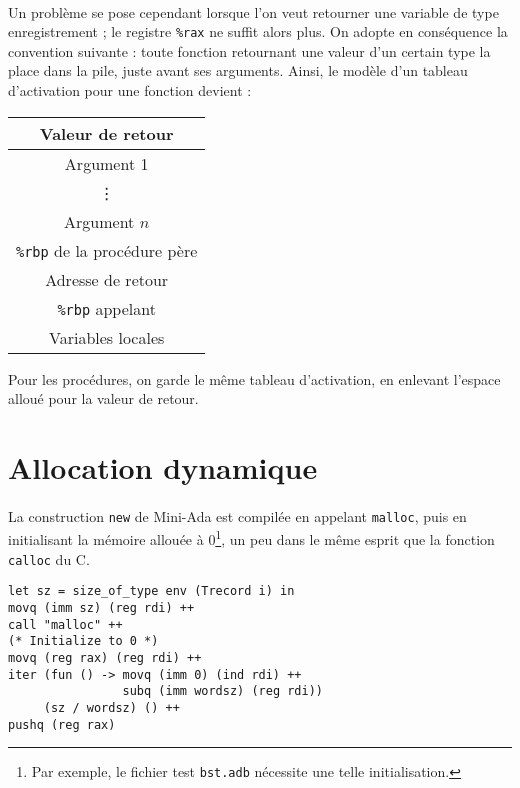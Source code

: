 \documentclass[a4paper,12pt]{article}
\begin{document}
\paragraph*{}
Un problème se pose cependant lorsque l'on veut retourner une variable de type enregistrement ; le registre
\texttt{\%rax} ne suffit alors plus. On adopte en conséquence la convention suivante : toute fonction retournant une valeur d'un certain type la place dans la pile,
juste avant ses arguments. Ainsi, le modèle d'un tableau d'activation pour une fonction devient :

\begin{center}
\begin{tabular}{|c|}
  \hline
  Valeur de retour\\
  \hline
  Argument 1\\
  \hline
  \vdots\\
  \hline
  Argument $n$\\
  \hline
  \texttt{\%rbp} de la procédure père\\
  \hline
  Adresse de retour\\ 
  \hline
  \texttt{\%rbp} appelant\\
  \hline
  Variables locales\\
  \hline
\end{tabular}
\end{center}

Pour les procédures, on garde le même tableau d'activation, en enlevant l'espace alloué pour la valeur de retour.

\section{Allocation dynamique}

\paragraph*{}
La construction \texttt{new} de Mini-Ada est compilée en appelant \texttt{malloc}, puis en initialisant la mémoire allouée à 0\footnote{Par exemple, le fichier
test \texttt{bst.adb} nécessite une telle initialisation.}, un peu dans le même esprit que la fonction \texttt{calloc} du C.

\begin{lstlisting}
let sz = size_of_type env (Trecord i) in
movq (imm sz) (reg rdi) ++
call "malloc" ++
(* Initialize to 0 *)
movq (reg rax) (reg rdi) ++
iter (fun () -> movq (imm 0) (ind rdi) ++
                subq (imm wordsz) (reg rdi))
     (sz / wordsz) () ++
pushq (reg rax)
\end{lstlisting}
\end{document}
